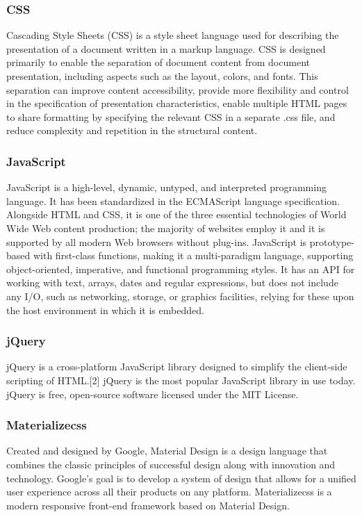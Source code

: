 \documentclass[11pt]{report}
\begin{document}
\subsubsection{CSS}
Cascading Style Sheets (CSS) is a style sheet language used for describing the presentation of a document written in a markup language. CSS is designed primarily to enable the separation of document content from document presentation, including aspects such as the layout, colors, and fonts. This separation can improve content accessibility, provide more flexibility and control in the specification of presentation characteristics, enable multiple HTML pages to share formatting by specifying the relevant CSS in a separate .css file, and reduce complexity and repetition in the structural content.

\subsubsection{JavaScript}
JavaScript is a high-level, dynamic, untyped, and interpreted programming language. It has been standardized in the ECMAScript language specification. Alongside HTML and CSS, it is one of the three essential technologies of World Wide Web content production; the majority of websites employ it and it is supported by all modern Web browsers without plug-ins. JavaScript is prototype-based with first-class functions, making it a multi-paradigm language, supporting object-oriented, imperative, and functional programming styles. It has an API for working with text, arrays, dates and regular expressions, but does not include any I/O, such as networking, storage, or graphics facilities, relying for these upon the host environment in which it is embedded.

\subsubsection{jQuery}
jQuery is a cross-platform JavaScript library designed to simplify the client-side scripting of HTML.[2] jQuery is the most popular JavaScript library in use today.  jQuery is free, open-source software licensed under the MIT License.

\subsubsection{Materializecss}
Created and designed by Google, Material Design is a design language that combines the classic principles of successful design along with innovation and technology. Google's goal is to develop a system of design that allows for a unified user experience across all their products on any platform. Materializecss is a modern responsive front-end framework based on Material Design.
\end{document}
